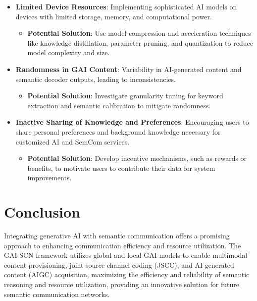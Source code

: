 \documentclass{article}
\begin{document}
\begin{itemize}
    \item \textbf{Limited Device Resources}: Implementing sophisticated AI models on devices with limited storage, memory, and computational power.
    \begin{itemize}
        \item \textbf{Potential Solution}: Use model compression and acceleration techniques like knowledge distillation, parameter pruning, and quantization to reduce model complexity and size.
    \end{itemize}
    \item \textbf{Randomness in GAI Content}: Variability in AI-generated content and semantic decoder outputs, leading to inconsistencies.
    \begin{itemize}
        \item \textbf{Potential Solution}: Investigate granularity tuning for keyword extraction and semantic calibration to mitigate randomness.
    \end{itemize}
    \item \textbf{Inactive Sharing of Knowledge and Preferences}: Encouraging users to share personal preferences and background knowledge necessary for customized AI and SemCom services.
    \begin{itemize}
        \item \textbf{Potential Solution}: Develop incentive mechanisms, such as rewards or benefits, to motivate users to contribute their data for system improvements.
    \end{itemize}
\end{itemize}

\section{Conclusion}

Integrating generative AI with semantic communication offers a promising approach to enhancing communication efficiency and resource utilization. The GAI-SCN framework utilizes global and local GAI models to enable multimodal content provisioning, joint source-channel coding (JSCC), and AI-generated content (AIGC) acquisition, maximizing the efficiency and reliability of semantic reasoning and resource utilization, providing an innovative solution for future semantic communication networks.
\end{document}
